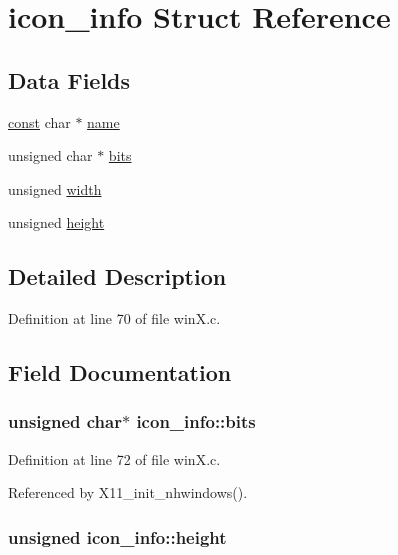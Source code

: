 \hypertarget{structicon__info}{\section{icon\+\_\+info Struct Reference}
\label{structicon__info}
}
\subsection*{Data Fields}
\begin{DoxyCompactItemize}
\item 
\hyperlink{tradstdc_8h_a2c212835823e3c54a8ab6d95c652660e}{const} char $\ast$ \hyperlink{structicon__info_a04df7988c8ff4df7c9eea4be5e73f063}{name}
\item 
unsigned char $\ast$ \hyperlink{structicon__info_a7a96cca6153684b42b422966158aa5d5}{bits}
\item 
unsigned \hyperlink{structicon__info_ad71603c600fd9734bcf1b5ee7a695c87}{width}
\item 
unsigned \hyperlink{structicon__info_a554d29a56ed3400902ba5aae9dcbc9e2}{height}
\end{DoxyCompactItemize}


\subsection{Detailed Description}


Definition at line 70 of file win\+X.\+c.



\subsection{Field Documentation}
\hypertarget{structicon__info_a7a96cca6153684b42b422966158aa5d5}{
\subsubsection[{bits}]{\setlength{\rightskip}{0pt plus 5cm}unsigned char$\ast$ icon\+\_\+info\+::bits}}\label{structicon__info_a7a96cca6153684b42b422966158aa5d5}


Definition at line 72 of file win\+X.\+c.



Referenced by X11\+\_\+init\+\_\+nhwindows().

\hypertarget{structicon__info_a554d29a56ed3400902ba5aae9dcbc9e2}{
\subsubsection[{height}]{\setlength{\rightskip}{0pt plus 5cm}unsigned icon\+\_\+info\+::height}}\label{structicon__info_a554d29a56ed3400902ba5aae9dcbc9e2}


